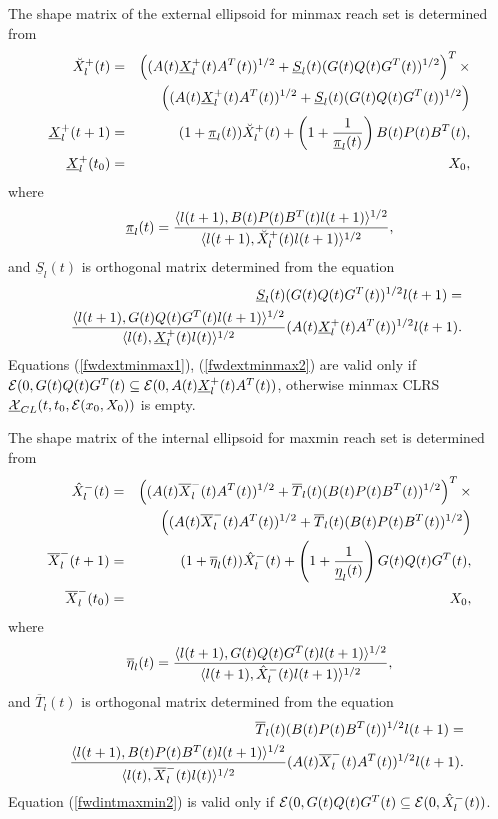 The shape matrix of the external ellipsoid for minmax reach set
is determined from
\begin{eqnarray}
\UUXP(t) & = &
\left((A(t)\UXP(t)A^T(t))^{1/2} +
\underline{S}_l(t)(G(t)Q(t)G^T(t))^{1/2}\right)^T
\times \nonumber \\
& &\left((A(t)\UXP(t)A^T(t))^{1/2} +
\underline{S}_l(t)(G(t)Q(t)G^T(t))^{1/2}\right)
\label{fwdextminmax1}\\
\UXP(t+1) & = &
(1+\underline{\pi}_l(t))\UUXP(t) +
\left(1+\frac{1}{\underline{\pi}_l(t)}\right)
B(t)P(t)B^T(t), \label{fwdextminmax2} \\
\UXP(t_0) & = & X_0, \label{fwdextminmax3}
\end{eqnarray}
where
\[ \underline{\pi}_l(t) = \frac{\langle l(t+1),
B(t)P(t)B^T(t)l(t+1)\rangle^{1/2}}{\langle l(t+1),
\UUXP(t)l(t+1)\rangle^{1/2}}, \]
and $\underline{S}_l(t)$ is orthogonal matrix determined from the equation
\begin{eqnarray*}
& & \underline{S}_l(t)(G(t)Q(t)G^T(t))^{1/2}l(t+1) = \\
& & \frac{\langle l(t+1),
G(t)Q(t)G^T(t)l(t+1)\rangle^{1/2}}{\langle l(t),
\UXP(t)l(t)\rangle^{1/2}}(A(t)\UXP(t)A^T(t))^{1/2}l(t+1).
\end{eqnarray*}
Equations (\ref{fwdextminmax1}), (\ref{fwdextminmax2}) are valid only if
$\EE(0,G(t)Q(t)G^T(t)\subseteq\EE(0,A(t)\UXP(t)A^T(t))$, otherwise
minmax CLRS $\UXCL(t,t_0,\EE(x_0,X_0))$ is empty.

The shape matrix of the internal ellipsoid for maxmin reach set
is determined from
\begin{eqnarray}
\OOXM(t) & = &
\left((A(t)\OXM(t)A^T(t))^{1/2} +
\overline{T}_l(t)(B(t)P(t)B^T(t))^{1/2}\right)^T
\times \nonumber \\
& &\left((A(t)\OXM(t)A^T(t))^{1/2} +
\overline{T}_l(t)(B(t)P(t)B^T(t))^{1/2}\right)
\label{fwdintmaxmin1}\\
\OXM(t+1) & = &
(1+\overline{\eta}_l(t))\OOXM(t) +
\left(1+\frac{1}{\underline{\eta}_l(t)}\right)
G(t)Q(t)G^T(t), \label{fwdintmaxmin2} \\
\OXM(t_0) & = & X_0, \label{fwdintmaxmin3}
\end{eqnarray}
where
\[ \overline{\eta}_l(t) = \frac{\langle l(t+1),
G(t)Q(t)G^T(t)l(t+1)\rangle^{1/2}}{\langle l(t+1),
\OOXM(t)l(t+1)\rangle^{1/2}}, \]
and $\overline{T}_l(t)$ is orthogonal matrix determined from the equation
\begin{eqnarray*}
& & \overline{T}_l(t)(B(t)P(t)B^T(t))^{1/2}l(t+1) = \\
& & \frac{\langle l(t+1),
B(t)P(t)B^T(t)l(t+1)\rangle^{1/2}}{\langle l(t),
\OXM(t)l(t)\rangle^{1/2}}(A(t)\OXM(t)A^T(t))^{1/2}l(t+1).
\end{eqnarray*}
Equation (\ref{fwdintmaxmin2}) is valid only if
$\EE(0,G(t)Q(t)G^T(t)\subseteq\EE(0,\OOXM(t))$.

